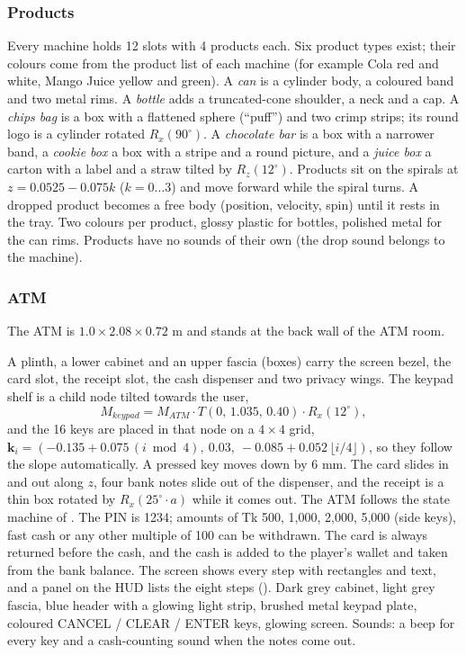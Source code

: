 \subsubsection{Products}
Every machine holds 12 slots with 4 products each. Six product types exist; their colours come from the
product list of each machine (for example Cola red and white, Mango Juice yellow and green).
 A \emph{can} is a cylinder body, a coloured band and two metal rims. A \emph{bottle}
adds a truncated-cone shoulder, a neck and a cap. A \emph{chips bag} is a box with a flattened sphere
(``puff'') and two crimp strips; its round logo is a cylinder rotated $R_x(90^\circ)$. A \emph{chocolate bar}
is a box with a narrower band, a \emph{cookie box} a box with a stripe and a round picture, and a
\emph{juice box} a carton with a label and a straw tilted by $R_z(12^\circ)$.
 Products sit on the spirals at $z = 0.0525 - 0.075k$ ($k=0\ldots3$) and move forward while
the spiral turns. A dropped product becomes a free body (position, velocity, spin) until it rests in the tray.
 Two colours per product, glossy plastic for bottles, polished metal
for the can rims. Products have no sounds of their own (the drop sound belongs to the machine).

\subsubsection{ATM}
The ATM is $1.0\times2.08\times0.72$ m and stands at the back wall of the ATM room.

 A plinth, a lower cabinet and an upper fascia (boxes) carry the screen bezel, the
card slot, the receipt slot, the cash dispenser and two privacy wings. The keypad shelf is a child node
tilted towards the user,
\[
M_{keypad} = M_{ATM}\cdot T(0,\,1.035,\,0.40)\cdot R_x(12^\circ),
\]
and the 16 keys are placed in that node on a $4\times4$ grid,
$\mathbf{k}_i = (-0.135 + 0.075\,(i \bmod 4),\ 0.03,\ -0.085 + 0.052\,\lfloor i/4\rfloor)$, so they follow the slope
automatically. A pressed key moves down by 6 mm. The card slides in and out along $z$, four bank notes slide
out of the dispenser, and the receipt is a thin box rotated by $R_x(25^\circ\cdot a)$ while it comes out.
 The ATM follows the state machine of . The PIN is 1234; amounts of
Tk 500, 1,000, 2,000, 5,000 (side keys), fast cash or any other multiple of 100 can be withdrawn. The card is
always returned before the cash, and the cash is added to the player's wallet and taken from the bank
balance. The screen shows every step with rectangles and text, and a panel on the HUD lists the eight steps
().
 Dark grey cabinet, light grey fascia, blue header with a glowing light
strip, brushed metal keypad plate, coloured CANCEL / CLEAR / ENTER keys, glowing screen. Sounds: a beep for
every key and a cash-counting sound when the notes come out.

